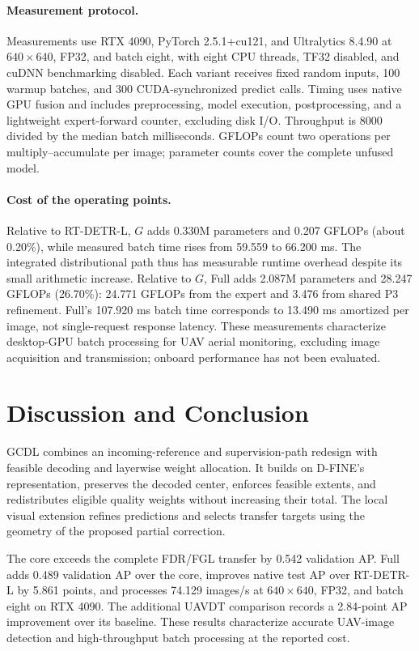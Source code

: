 \paragraph{Measurement protocol.}
Measurements use RTX 4090, PyTorch 2.5.1+cu121, and Ultralytics 8.4.90 at $640\times640$, FP32, and batch eight, with eight CPU threads, TF32 disabled, and cuDNN benchmarking disabled. Each variant receives fixed random inputs, 100 warmup batches, and 300 CUDA-synchronized predict calls. Timing uses native GPU fusion and includes preprocessing, model execution, postprocessing, and a lightweight expert-forward counter, excluding disk I/O. Throughput is 8000 divided by the median batch milliseconds. GFLOPs count two operations per multiply--accumulate per image; parameter counts cover the complete unfused model.

\paragraph{Cost of the operating points.}
Relative to RT-DETR-L, $G$ adds 0.330M parameters and 0.207 GFLOPs (about 0.20\%), while measured batch time rises from 59.559 to 66.200 ms. The integrated distributional path thus has measurable runtime overhead despite its small arithmetic increase. Relative to $G$, Full adds 2.087M parameters and 28.247 GFLOPs (26.70\%): 24.771 GFLOPs from the expert and 3.476 from shared P3 refinement. Full's 107.920 ms batch time corresponds to 13.490 ms amortized per image, not single-request response latency. These measurements characterize desktop-GPU batch processing for UAV aerial monitoring, excluding image acquisition and transmission; onboard performance has not been evaluated.

\section{Discussion and Conclusion}
GCDL combines an incoming-reference and supervision-path redesign with feasible decoding and layerwise weight allocation. It builds on D-FINE's representation, preserves the decoded center, enforces feasible extents, and redistributes eligible quality weights without increasing their total. The local visual extension refines predictions and selects transfer targets using the geometry of the proposed partial correction.

The core exceeds the complete FDR/FGL transfer by 0.542 validation AP. Full adds 0.489 validation AP over the core, improves native test AP over RT-DETR-L by 5.861 points, and processes 74.129 images/s at $640\times640$, FP32, and batch eight on RTX 4090. The additional UAVDT comparison records a 2.84-point AP improvement over its baseline. These results characterize accurate UAV-image detection and high-throughput batch processing at the reported cost.

